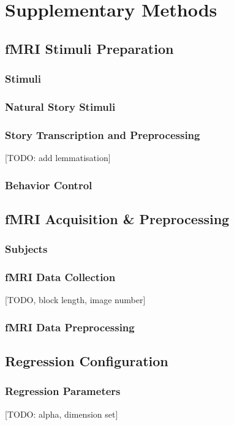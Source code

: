 \chapter{Supplementary Methods} %
\label{app:suppmethods}

\section{fMRI Stimuli Preparation}
\subsection{Stimuli}
\subsection{Natural Story Stimuli}
\subsection{Story Transcription and Preprocessing}
[TODO: add lemmatisation]
\subsection{Behavior Control}

\section{fMRI Acquisition \& Preprocessing}
\label{appsec:fmriacquisition} %
\subsection{Subjects}
\subsection{fMRI Data Collection}
\label{appsubsec:fmridata}
[TODO, block length, image number]
\subsection{fMRI Data Preprocessing}

\section{Regression Configuration}
\subsection{Regression Parameters}
\label{appsubsec:regressionparameters}
[TODO: alpha, dimension set]

